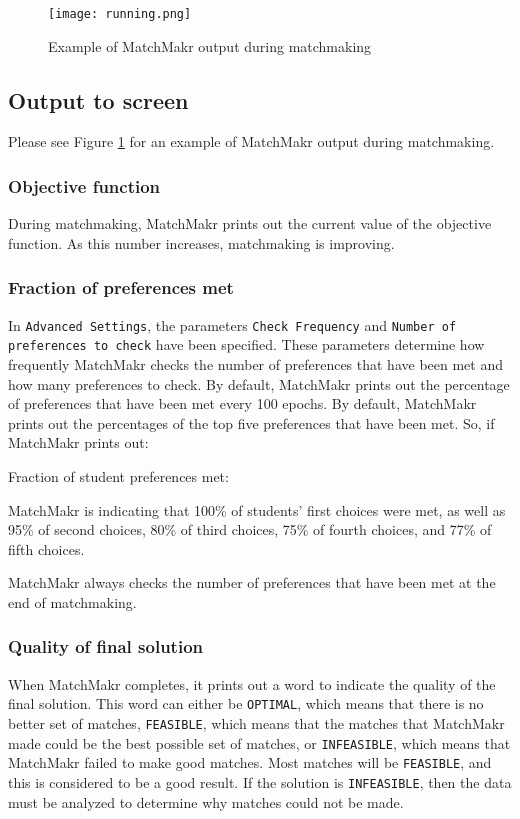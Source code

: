\begin{figure}
	\centering
	\texttt{[image: running.png]}
	\caption{\label{fig:running} Example of MatchMakr output during matchmaking}
\end{figure}

\subsection{Output to screen}
Please see Figure \ref{fig:running} for an example of MatchMakr output during matchmaking.

\subsubsection{Objective function}
During matchmaking, MatchMakr prints out the current value of the objective function.  As this number increases, matchmaking is improving.

\subsubsection{Fraction of preferences met}
In \texttt{Advanced Settings}, the parameters \texttt{Check Frequency} and \texttt{Number of preferences to check} have been specified.  These parameters determine how frequently MatchMakr checks the number of preferences that have been met and how many preferences to check.  By default, MatchMakr prints out the percentage of preferences that have been met every 100 epochs.  By default, MatchMakr prints out the percentages of the top five preferences that have been met.  So, if MatchMakr prints out:


Fraction of student preferences met: \\
\left[1.0, 0.95, 0.8, 0.75, 0.77\right]


MatchMakr is indicating that 100\% of students' first choices were met, as well as 95\% of second choices, 80\% of third choices, 75\% of fourth choices, and 77\% of fifth choices.

MatchMakr always checks the number of preferences that have been met at the end of matchmaking.

\subsubsection{Quality of final solution}
When MatchMakr completes, it prints out a word to indicate the quality of the final solution.  This word can either be \texttt{OPTIMAL}, which means that there is no better set of matches, \texttt{FEASIBLE}, which means that the matches that MatchMakr made could be the best possible set of matches, or \texttt{INFEASIBLE}, which means that MatchMakr failed to make good matches.  Most matches will be \texttt{FEASIBLE}, and this is considered to be a good result.  If the solution is \texttt{INFEASIBLE}, then the data must be analyzed to determine why matches could not be made.

